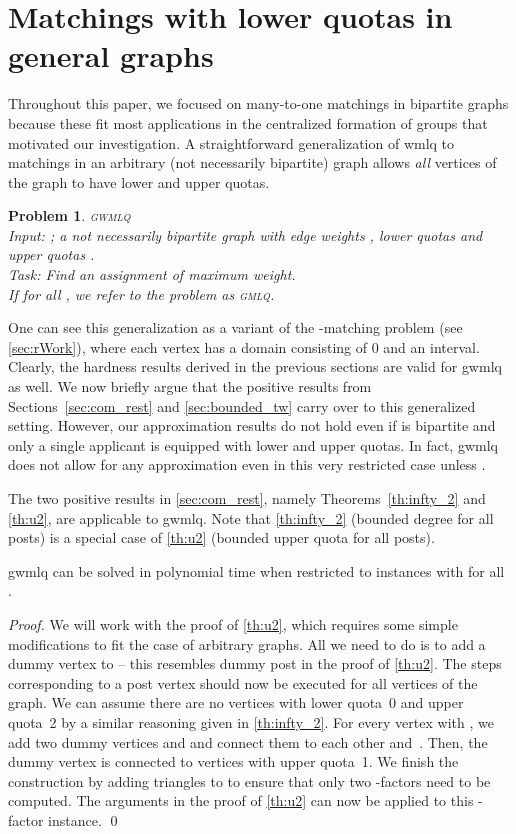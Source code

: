\documentclass{llncs}
\newtheorem{pr}[theorem]{Problem}
\begin{document}
\section{Matchings with lower quotas in general graphs}
\label{sec:many}

Throughout this paper, we focused on many-to-one matchings in bipartite graphs because these fit most applications in the centralized formation of groups that motivated our investigation. A straightforward generalization of {\sc wmlq} to matchings in an arbitrary (not necessarily bipartite) graph  allows \textit{all} vertices of the graph to have lower and upper quotas. 

\begin{pr} \textsc{gwmlq}\ \\
	Input: ; a not necessarily bipartite graph  with edge weights , lower quotas  and upper quotas .\\
Task: Find an assignment of maximum weight.\\
If  for all , we refer to the problem as \textsc{gmlq}.
\end{pr}

One can see this generalization as a variant of the -matching problem (see \cref{sec:rWork}), where each vertex has a domain consisting of 0 and an interval. Clearly, the hardness results derived in the previous sections are valid for {\sc gwmlq} as well. We now briefly argue that the positive results from Sections~\ref{sec:com_rest} and \ref{sec:bounded_tw} carry over to this generalized setting. However, our approximation results do not hold even if  is bipartite and only a single applicant is equipped with lower and upper quotas. In fact, {\sc gwmlq} does not allow for any approximation even in this very restricted case unless .
\smallskip

The two positive results in \cref{sec:com_rest}, namely Theorems~\ref{th:infty_2} and \ref{th:u2}, are applicable to {\sc gwmlq}. Note that \cref{th:infty_2} (bounded degree for all posts) is a special case of \cref{th:u2} (bounded upper quota for all posts).

\begin{theorem}
	 {\sc gwmlq} can be solved in polynomial time when restricted to instances with  for all .
\end{theorem}

\begin{proof}
We will work with the proof of \cref{th:u2}, which requires some simple modifications to fit the case of arbitrary graphs. All we need to do is to add a dummy vertex  to  -- this resembles dummy post  in the proof of \cref{th:u2}. The steps corresponding to a post vertex should now be executed for all vertices of the graph. We can assume there are no vertices with lower quota~0 and upper quota~2 by a similar reasoning given in \cref{th:infty_2}. For every vertex  with , we add two dummy vertices  and  and connect them to each other and~.  Then, the dummy vertex  is connected to vertices with upper quota~1. We finish the construction by adding triangles to  to ensure that only two -factors need to be computed. The arguments in the proof of \cref{th:u2} can now be applied to this -factor instance. \qed
\end{proof}
\end{document}
